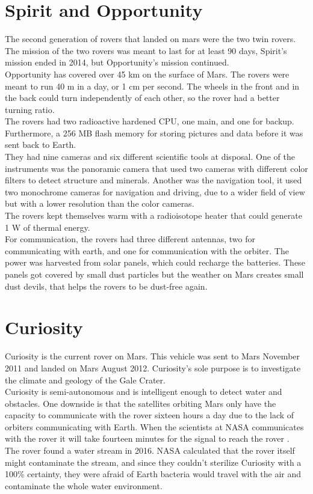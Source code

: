 \section{Spirit and Opportunity} \label{ch:existingSolutions_SpiritOpportunity} 
The second generation of rovers that landed on mars were the two twin rovers. The mission of the two rovers was meant to last for at least 90 days, Spirit’s mission ended in 2014, but Opportunity's mission continued.\\ Opportunity has covered over 45 km on the surface of Mars. The rovers were meant to run 40 m in a day, or 1 cm per second. The wheels in the front and in the back could turn independently of each other, so the rover had a better turning ratio.\\
The rovers had two radioactive hardened CPU, one main, and one for backup. Furthermore, a 256 MB flash memory for storing pictures and data before it was sent back to Earth\cite{spiritopportunity_overview}.\\ They had nine cameras and six different scientific tools at disposal. One of the instruments was the panoramic camera that used two cameras with different color filters to detect structure and minerals. Another was the navigation tool, it used two monochrome cameras for navigation and driving, due to a wider field of view but with a lower resolution than the color cameras.\\The rovers kept themselves warm with a radioisotope heater that could generate 1 W of thermal energy.\\ For communication, the rovers had three different antennas, two for communicating with earth, and one for communication with the orbiter. The power was harvested from solar panels, which could recharge the batteries. These panels got covered by small dust particles but the weather on Mars creates small dust devils, that helps the rovers to be dust-free again\cite{Marsdust}.

\section{Curiosity}
\label{ch:existingSolutions_Curiosity}
Curiosity is the current rover on Mars. This vehicle was sent to Mars November 2011 and landed on Mars August 2012. Curiosity's sole purpose is to investigate the climate and geology of the Gale Crater\cite{CuriosityMissions}.\\ Curiosity is semi-autonomous and is intelligent enough to detect water and obstacles. One downside is that the satellites orbiting Mars only have the capacity to communicate with the rover sixteen hours a day due to the lack of orbiters communicating with Earth. When the scientists at NASA communicates with the rover it will take fourteen minutes for the signal to reach the rover\cite{CuriosityCommunication} \cite{CuriosityNASA}.\\
The rover found a water stream in 2016. NASA calculated that the rover itself might contaminate the stream, and since they couldn't sterilize Curiosity with a 100\% certainty, they were afraid of Earth bacteria would travel with the air and contaminate the whole water environment\cite{Curiosity2016}.\\
\newpage


